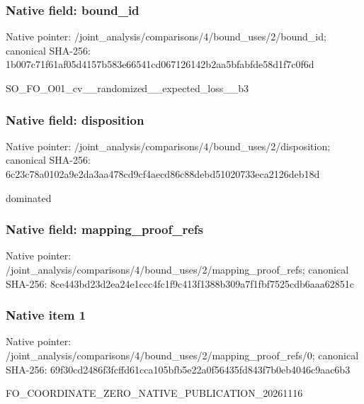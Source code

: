 \documentclass[10pt,a4paper]{article}
\begin{document}
\subsubsection{Native field: bound\_\allowbreak{}id}
Native pointer: /joint\_\allowbreak{}analysis/comparisons/4/bound\_\allowbreak{}uses/2/bound\_\allowbreak{}id; canonical SHA-256: 1b007c71f61af05d4157b583e66541cd067126142b2aa5bfabfde58d1f7c0f6d

\begingroup\raggedright\sloppy SO\_\allowbreak{}FO\_\allowbreak{}O01\_\allowbreak{}cv\_\allowbreak{}\_\allowbreak{}randomized\_\allowbreak{}\_\allowbreak{}expected\_\allowbreak{}loss\_\allowbreak{}\_\allowbreak{}b3\par\endgroup

\subsubsection{Native field: disposition}
Native pointer: /joint\_\allowbreak{}analysis/comparisons/4/bound\_\allowbreak{}uses/2/disposition; canonical SHA-256: 6c23c78a0102a9e2da3aa478cd9cf4aecd86c88debd51020733eca2126deb18d

\begingroup\raggedright\sloppy dominated\par\endgroup

\subsubsection{Native field: mapping\_\allowbreak{}proof\_\allowbreak{}refs}
Native pointer: /joint\_\allowbreak{}analysis/comparisons/4/bound\_\allowbreak{}uses/2/mapping\_\allowbreak{}proof\_\allowbreak{}refs; canonical SHA-256: 8ce443bd23d2ea24e1ccc4fc1f9c413f1388b309a7f1fbf7525cdb6aaa62851c

\subsubsection{Native item 1}
Native pointer: /joint\_\allowbreak{}analysis/comparisons/4/bound\_\allowbreak{}uses/2/mapping\_\allowbreak{}proof\_\allowbreak{}refs/0; canonical SHA-256: 69f30cd2486f3fcffd61cca105bfb5e22a0f56435fd843f7b0eb4046c9aac6b3

\begingroup\raggedright\sloppy FO\_\allowbreak{}COORDINATE\_\allowbreak{}ZERO\_\allowbreak{}NATIVE\_\allowbreak{}PUBLICATION\_\allowbreak{}20261116\par\endgroup
\end{document}
